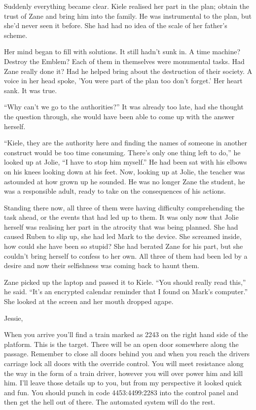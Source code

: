 Suddenly everything became clear.  Kiele realised her part in the plan; obtain the trust of Zane and bring him into the family.  He was instrumental to the plan, but she'd never seen it before.  She had had no idea of the scale of her father's scheme.  

Her mind began to fill with solutions.  It still hadn't sunk in.  A time machine?  Destroy the Emblem?  Each of them in themselves were monumental tasks.  Had Zane really done it?  Had he helped bring about the destruction of their society.  A voice in her head spoke, 'You were part of the plan too don't forget.'  Her heart sank.  It was true.  

``Why can't we go to the authorities?''  It was already too late, had she thought the question through, she would have been able to come up with the answer herself.

``Kiele, they are the authority here and finding the names of someone in another construct would be too time consuming.  There's only one thing left to do,'' he looked up at Jolie, ``I have to stop him myself.''  He had been sat with his elbows on his knees looking down at his feet.  Now, looking up at Jolie, the teacher was astounded at how grown up he sounded.  He was no longer Zane the student, he was a responsible adult, ready to take on the consequences of his actions.

Standing there now, all three of them were having difficulty comprehending the task ahead, or the events that had led up to them.  It was only now that Jolie herself was realising her part in the atrocity that was being planned.  She had caused Ruben to slip up, she had led Mark to the device.  She screamed inside, how could she have been so stupid?  She had berated Zane for his part, but she couldn't bring herself to confess to her own.  All three of them had been led by a desire and now their selfishness was coming back to haunt them.

Zane picked up the laptop and passed it to Kiele.  ``You should really read this,'' he said.  ``It's an encrypted calendar reminder that I found on Mark's computer.''  She looked at the screen and her mouth dropped agape.  



Jessie, 



When you arrive you'll find a train marked as 2243 on the right hand side of the platform.  This is the target.  There will be an open door somewhere along the passage.  Remember to close all doors behind you and when you reach the drivers carriage lock all doors with the override control.  You will meet resistance along the way in the form of a train driver, however you will over power him and kill him.  I'll leave those details up to you, but from my perspective it looked quick and fun.  You should punch in code 4453:4499:2283 into the control panel and then get the hell out of there.  The automated system will do the rest.  


